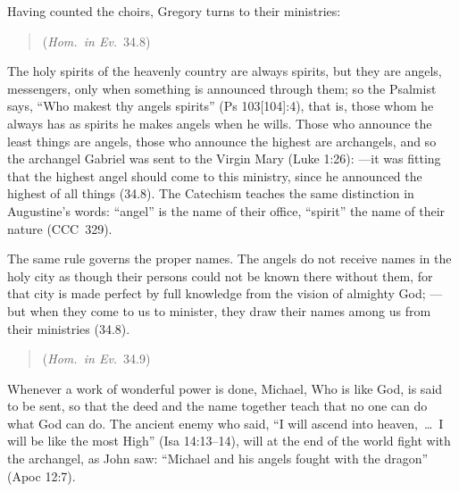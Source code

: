 Having counted the choirs, Gregory turns to their ministries:

\begin{quote}
 (\emph{Hom.\ in Ev.}\ 34.8)
\end{quote}

\noindent The holy spirits of the heavenly country are always spirits, but
they are angels, messengers, only when something is announced through them;
so the Psalmist says, ``Who makest thy angels spirits'' (Ps 103[104]:4), that
is, those whom he always has as spirits he makes angels when he wills. Those
who announce the least things are angels, those who announce the highest are
archangels, and so the archangel Gabriel was sent to the Virgin Mary (Luke
1:26): ---it was fitting that the highest angel should
come to this ministry, since he announced the highest of all things (34.8).
The Catechism teaches the same distinction in Augustine's words: ``angel'' is
the name of their office, ``spirit'' the name of their nature (CCC~329).

The same rule governs the proper names. The angels do not receive names in
the holy city as though their persons could not be known there without them,
for that city is made perfect by full knowledge from the vision of almighty
God; ---but when they come to us to minister, they
draw their names among us from their ministries (34.8).

\begin{quote}
 (\emph{Hom.\ in Ev.}\ 34.9)
\end{quote}

\noindent Whenever a work of wonderful power is done, Michael, Who is like
God, is said to be sent, so that the deed and the name together teach that
no one can do what God can do. The ancient enemy who said, ``I will ascend
into heaven,~\dots\ I will be like the most High'' (Isa 14:13--14), will at
the end of the world fight with the archangel, as John saw: ``Michael and his
angels fought with the dragon'' (Apoc 12:7).

